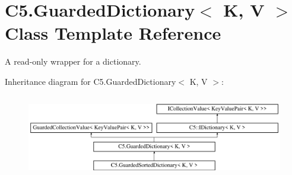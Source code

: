 \hypertarget{class_c5_1_1_guarded_dictionary}{}\section{C5.\+Guarded\+Dictionary$<$ K, V $>$ Class Template Reference}
\label{class_c5_1_1_guarded_dictionary}


A read-\/only wrapper for a dictionary.  


Inheritance diagram for C5.\+Guarded\+Dictionary$<$ K, V $>$\+:\begin{figure}[H]
\begin{center}
\leavevmode
\includegraphics[height=3.672131cm]{class_c5_1_1_guarded_dictionary}
\end{center}
\end{figure}
